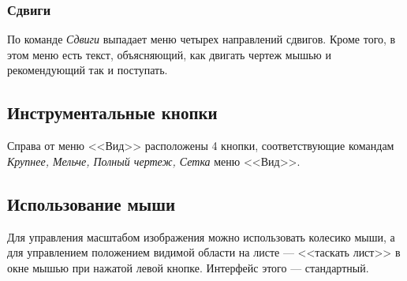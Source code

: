 \subsubsection{Сдвиги}

По команде \emph{Сдвиги} выпадает меню четырех направлений сдвигов. Кроме того, в этом меню есть текст,  объясняющий, как двигать чертеж мышью и рекомендующий так и поступать.

\subsection{Инструментальные кнопки}

Справа от меню <<Вид>> расположены 4 кнопки, соответствующие командам \emph{Крупнее, Мельче, Полный чертеж, Сетка} меню <<Вид>>.

\subsection{Использование мыши}
\label{drawmouse}

Для управления масштабом изображения можно использовать колесико мыши, а для управлением положением видимой области на листе --- <<таскать лист>> в окне мышью при нажатой левой кнопке. Интерфейс этого --- стандартный.
